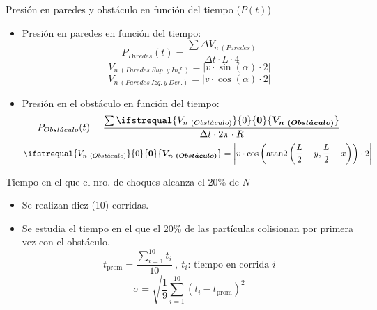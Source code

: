 \documentclass{beamer}
\DeclareMathOperator{\atantwo}{atan2}
\renewcommand\vec[1]{\ifstrequal{#1}{0}{\ensuremath{\mathbf{0}}}{\ensuremath{\boldsymbol{#1}}}}
\begin{document}
            \begin{frame}{Presión en paredes y obstáculo en función del tiempo ($P(t)$)}
                \begin{itemize}
                    \item Presión en paredes en función del tiempo:
                    \begin{equation*}
                        P_{Paredes}(t) = \frac{\sum \Delta V_{n\ (Paredes)}}{\Delta t \cdot L \cdot 4}
                    \end{equation*}
                    \begin{equation*}
                        V_{n\ (Paredes\ Sup.\ y\ Inf.)} = \left| v \cdot \sin(\alpha) \cdot 2 \right|
                    \end{equation*}
                    \begin{equation*}
                        V_{n\ (Paredes\ Izq.\ y\ Der.)} = \left| v \cdot \cos(\alpha) \cdot 2 \right|
                    \end{equation*}
                    \item Presión en el obstáculo en función del tiempo:
                    \begin{equation*}
                        P_{Obst\acute{a}culo}(t) = \frac{\sum \vec{V_{n\ (Obst\acute{a}culo)}}}{\Delta t \cdot 2\pi \cdot R}
                    \end{equation*}
                    \begin{equation*}
                              \vec{V_{n\ (Obst\acute{a}culo)}} = \left| {v \cdot \cos \left( \atantwo \left(\frac{L}{2} - y, \frac{L}{2} - x \right) \right) \cdot 2} \right|
                    \end{equation*}
                \end{itemize}
            \end{frame}

            \begin{frame}{Tiempo en el que el nro. de choques alcanza el 20\% de $N$ }
                \begin{itemize}
                    \item Se realizan diez (10) corridas.
                    \item Se estudia el tiempo en el que el 20\% de las partículas colisionan por primera vez con el obstáculo.
                    \begin{equation*}
                        t_{\text{prom}} = \frac{\sum_{i=1}^{10} t_i}{10} \ ,\ t_i\text{: tiempo en corrida }i
                    \end{equation*}
                    \begin{equation*}
                              \sigma = \sqrt{\frac{1}{9} \sum_{i=1}^{10} (t_i - t_{\text{prom}})^2}
                    \end{equation*}
                \end{itemize}
            \end{frame}
\end{document}
